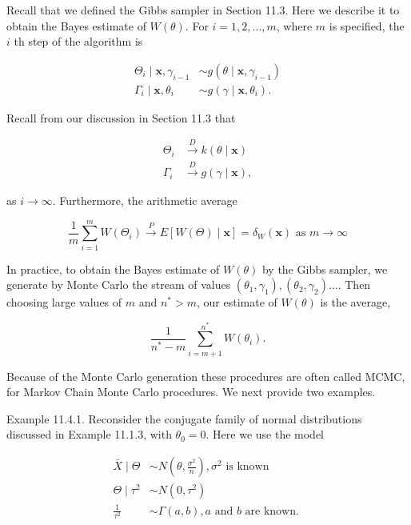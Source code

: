 Recall that we defined the Gibbs sampler in Section 11.3. Here we describe it to obtain the Bayes estimate of $W(\theta)$. For $i=1,2, \ldots, m$, where $m$ is specified, the\\
$i$ th step of the algorithm is

$$
\begin{aligned}
\Theta_{i} \mid \mathbf{x}, \gamma_{i-1} & \sim g\left(\theta \mid \mathbf{x}, \gamma_{i-1}\right) \\
\Gamma_{i} \mid \mathbf{x}, \theta_{i} & \sim g\left(\gamma \mid \mathbf{x}, \theta_{i}\right) .
\end{aligned}
$$

Recall from our discussion in Section 11.3 that

$$
\begin{aligned}
\Theta_{i} & \xrightarrow{D} k(\theta \mid \mathbf{x}) \\
\Gamma_{i} & \xrightarrow{D} g(\gamma \mid \mathbf{x}),
\end{aligned}
$$

as $i \rightarrow \infty$. Furthermore, the arithmetic average


\begin{equation*}
\frac{1}{m} \sum_{i=1}^{m} W\left(\Theta_{i}\right) \xrightarrow{P} E[W(\Theta) \mid \mathbf{x}]=\delta_{W}(\mathbf{x}) \text { as } m \rightarrow \infty \tag{11.4.4}
\end{equation*}


In practice, to obtain the Bayes estimate of $W(\theta)$ by the Gibbs sampler, we generate by Monte Carlo the stream of values $\left(\theta_{1}, \gamma_{1}\right),\left(\theta_{2}, \gamma_{2}\right) \ldots$. Then choosing large values of $m$ and $n^{*}>m$, our estimate of $W(\theta)$ is the average,


\begin{equation*}
\frac{1}{n^{*}-m} \sum_{i=m+1}^{n^{*}} W\left(\theta_{i}\right) . \tag{11.4.5}
\end{equation*}


Because of the Monte Carlo generation these procedures are often called MCMC, for Markov Chain Monte Carlo procedures. We next provide two examples.

Example 11.4.1. Reconsider the conjugate family of normal distributions discussed in Example 11.1.3, with $\theta_{0}=0$. Here we use the model


\begin{align*}
\bar{X} \mid \Theta & \sim N\left(\theta, \frac{\sigma^{2}}{n}\right), \sigma^{2} \text { is known } \\
\Theta \mid \tau^{2} & \sim N\left(0, \tau^{2}\right) \\
\frac{1}{\tau^{2}} & \sim \Gamma(a, b), a \text { and } b \text { are known. } \tag{11.4.6}
\end{align*}



